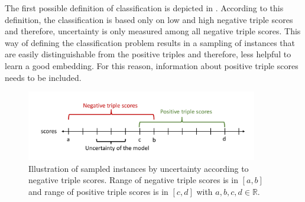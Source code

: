 The first possible definition of classification is depicted in .
According to this definition, the classification is based only on low and high negative triple scores and therefore, uncertainty is only measured among all negative triple scores.
This way of defining the classification problem results in a sampling of instances that are easily distinguishable from the positive triples and therefore, less helpful to learn a good embedding.
For this reason, information about positive triple scores needs to be included.
\clearpage
\begin{figure}[H]
  \centering
    \includegraphics[width=0.9\textwidth]{figures/badVsGoodApproach.pdf}
  \caption{Illustration of sampled instances by uncertainty according to negative triple scores.
  Range of negative triple scores is in $[a, b]$ and range of positive triple scores is in  $[c, d]$ with $a,b,c,d \in \mathbb{R}$.}
  \label{fig:badVsGoodApproach}
\end{figure}

